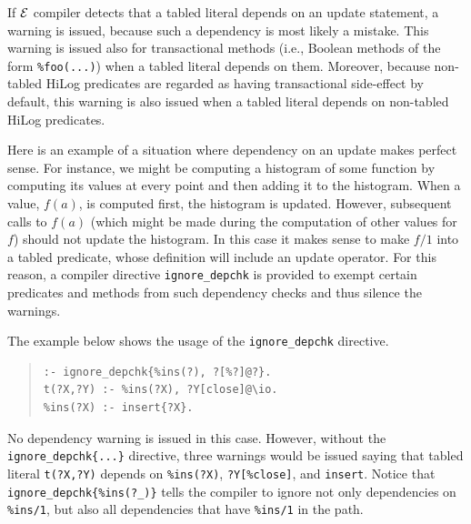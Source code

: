 \documentclass[11pt]{article}
\newcommand{\FLORA}{{\mbox{\smaller{\sc ${\cal F}${lora}\rm\emph{-2}}}}\xspace}
\newcommand{\ERGO}{\mbox{\ensuremath{\cal{E}}\smaller{{\sc{RGO}}}}\xspace}
\newcommand{\FLSYSTEM}{\ERGO}
\begin{document}
If \FLSYSTEM compiler detects that a tabled literal depends on an update
statement, a warning is issued, because such a dependency is most likely a
mistake. This warning is issued also for transactional methods (i.e.,
Boolean methods of the form {\tt \%foo(...)}) when a tabled literal depends
on them. Moreover, because non-tabled HiLog predicates are regarded as having
transactional side-effect by default, this warning is also issued when a
tabled literal depends on non-tabled HiLog predicates.


\label{page-histogram}
Here is an example of a situation where
dependency on an update makes perfect
sense. For instance, we might be computing a histogram of some function
by computing its values at every point and then adding it to the
histogram. When a value, $f(a)$, is computed first, the histogram is
updated. However, subsequent calls to $f(a)$ (which might be made during
the computation of other values for $f$) should not update the histogram.
In this case it makes sense to make $f/1$ into a tabled predicate, whose
definition will include an update operator. For this reason, a compiler
directive {\tt ignore\_depchk} is provided to exempt certain predicates
and methods from such dependency checks and thus silence the warnings.

The example below shows the usage of the {\tt ignore\_depchk} directive.
\begin{quote}
\begin{verbatim}
:- ignore_depchk{%ins(?), ?[%?]@?}.
t(?X,?Y) :- %ins(?X), ?Y[close]@\io. 
%ins(?X) :- insert{?X}. 
\end{verbatim}
\end{quote}
No dependency warning is issued in this case. However, without the
{\tt ignore\_depchk\{...\}} directive, three warnings would be issued saying that
tabled literal {\tt t(?X,?Y)} depends on {\tt \%ins(?X)}, {\tt ?Y[\%close]},
and {\tt insert}. Notice that {\tt ignore\_depchk\{\%ins(?\_)\}} tells the
compiler to ignore not only dependencies on {\tt \%ins/1}, but also all
dependencies that have {\tt \%ins/1} in the path.
\end{document}
